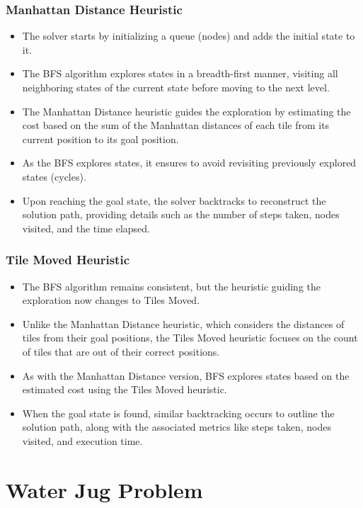 \documentclass[12pt]{article}
\begin{document}
\subsubsection*{Manhattan Distance Heuristic}
\begin{itemize}
        \item The solver starts by initializing a queue (nodes) and adds the initial state to it.
        \item The BFS algorithm explores states in a breadth-first manner, visiting all neighboring states of the current state before moving to the next level.
        \item The Manhattan Distance heuristic guides the exploration by estimating the cost based on the sum of the Manhattan distances of each tile from its current position to its goal position.
        \item As the BFS explores states, it ensures to avoid revisiting previously explored states (cycles).
        \item Upon reaching the goal state, the solver backtracks to reconstruct the solution path, providing details such as the number of steps taken, nodes visited, and the time elapsed.
\end{itemize}
\subsubsection*{Tile Moved Heuristic}
\begin{itemize}
        \item The BFS algorithm remains consistent, but the heuristic guiding the exploration now changes to Tiles Moved.
        \item Unlike the Manhattan Distance heuristic, which considers the distances of tiles from their goal positions, the Tiles Moved heuristic focuses on the count of tiles that are out of their correct positions.
        \item As with the Manhattan Distance version, BFS explores states based on the estimated cost using the Tiles Moved heuristic.
        \item When the goal state is found, similar backtracking occurs to outline the solution path, along with the associated metrics like steps taken, nodes visited, and execution time.
\end{itemize}

\clearpage
\section{Water Jug Problem}
\end{document}

